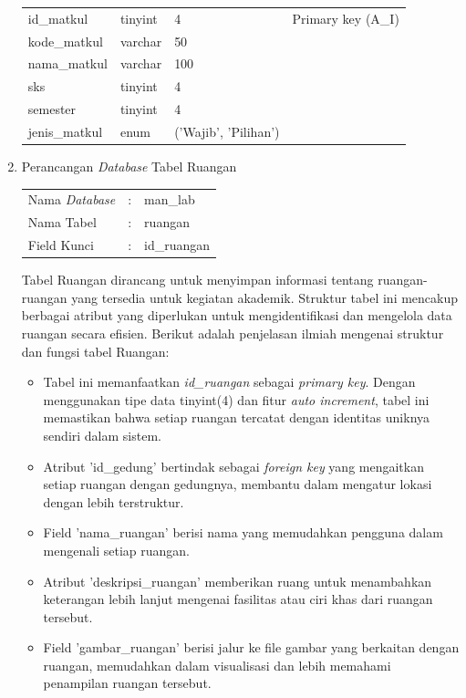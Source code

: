 \begin{enumerate}
{\begin{longtable}{l l l l}
				      id\_matkul              & tinyint                & 4                        & Primary key (A\_I)                \\
				      kode\_matkul            & varchar                & 50                       &                                   \\
				      nama\_matkul            & varchar                & 100                      &                                   \\
				      sks                     & tinyint                & 4                        &                                   \\
				      semester                & tinyint                & 4                        &                                   \\
				      jenis\_matkul           & enum                   & ('Wajib', 'Pilihan')     &                                   \\
				      \hline
			      \end{longtable}
		      }

	\item Perancangan \textit{Database} Tabel Ruangan \\
	      \begin{tabular}{lll}
		      Nama \textit{Database} & : & man\_lab    \\
		      Nama Tabel             & : & ruangan     \\
		      Field Kunci            & : & id\_ruangan \\
	      \end{tabular}

	      Tabel Ruangan dirancang untuk menyimpan informasi tentang ruangan-ruangan yang tersedia untuk kegiatan akademik. Struktur tabel ini mencakup berbagai atribut yang diperlukan untuk mengidentifikasi dan mengelola data ruangan secara efisien. Berikut adalah penjelasan ilmiah mengenai struktur dan fungsi tabel Ruangan:

	      \begin{itemize}
		      \item Tabel ini memanfaatkan \textit{id\_ruangan} sebagai \textit{primary key}. Dengan menggunakan tipe data tinyint(4) dan fitur \textit{auto increment}, tabel ini memastikan bahwa setiap ruangan tercatat dengan identitas uniknya sendiri dalam sistem.
		      \item Atribut 'id\_gedung' bertindak sebagai \textit{foreign key} yang mengaitkan setiap ruangan dengan gedungnya, membantu dalam mengatur lokasi dengan lebih terstruktur.
		      \item Field 'nama\_ruangan' berisi nama yang memudahkan pengguna dalam mengenali setiap ruangan.
		      \item Atribut 'deskripsi\_ruangan' memberikan ruang untuk menambahkan keterangan lebih lanjut mengenai fasilitas atau ciri khas dari ruangan tersebut.
		      \item Field 'gambar\_ruangan' berisi jalur ke file gambar yang berkaitan dengan ruangan, memudahkan dalam visualisasi dan lebih memahami penampilan ruangan tersebut.
	      \end{itemize}


\end{enumerate}

